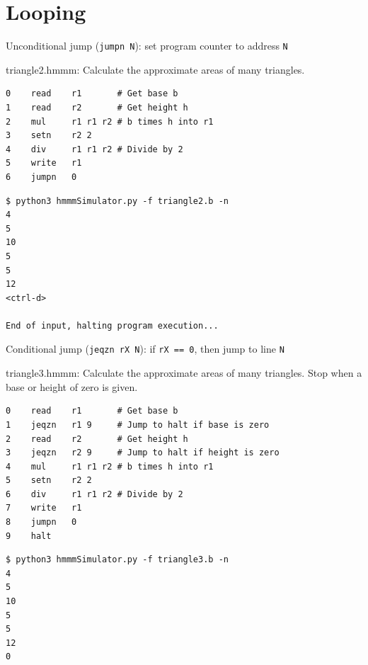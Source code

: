 \documentclass[8pt,a4paper,compress]{beamer}
\begin{document}
\section{Looping}
\begin{frame}[fragile]
\pause

Unconditional jump (\lstinline{jumpn N}): set program counter to address \lstinline{N}

\pause
\bigskip

\begin{framed}
\tiny triangle2.hmmm: Calculate the approximate areas of many triangles.
\end{framed}

\begin{lstlisting}[language={}]
0    read    r1       # Get base b
1    read    r2       # Get height h
2    mul     r1 r1 r2 # b times h into r1
3    setn    r2 2
4    div     r1 r1 r2 # Divide by 2
5    write   r1
6    jumpn   0
\end{lstlisting}

\pause

\begin{lstlisting}[language={}]
$ python3 hmmmSimulator.py -f triangle2.b -n
4
5
10
5
5
12
<ctrl-d>

End of input, halting program execution...
\end{lstlisting}
\end{frame}

\begin{frame}[fragile]
\pause

Conditional jump (\lstinline{jeqzn rX N}): if \lstinline{rX == 0}, then jump to line \lstinline{N}

\pause
\bigskip

\begin{framed}
\tiny triangle3.hmmm: Calculate the approximate areas of many triangles. Stop when a base or height of zero is given.
\end{framed}

\begin{lstlisting}[language={}]
0    read    r1       # Get base b
1    jeqzn   r1 9     # Jump to halt if base is zero
2    read    r2       # Get height h
3    jeqzn   r2 9     # Jump to halt if height is zero
4    mul     r1 r1 r2 # b times h into r1
5    setn    r2 2
6    div     r1 r1 r2 # Divide by 2
7    write   r1
8    jumpn   0
9    halt
\end{lstlisting}

\pause

\begin{lstlisting}[language={}]
$ python3 hmmmSimulator.py -f triangle3.b -n
4
5
10
5
5
12
0
\end{lstlisting}
\end{frame}
\end{document}
